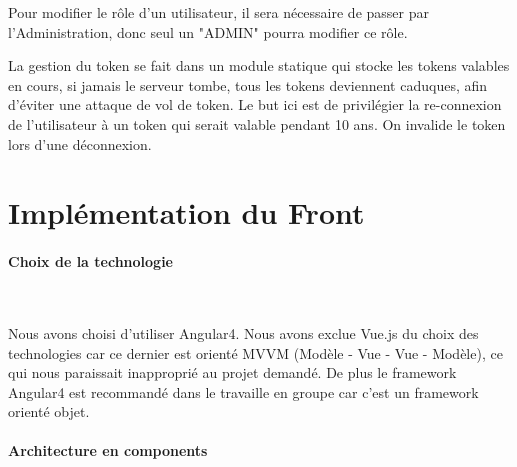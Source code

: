 \documentclass{article}
\begin{document}
  Pour modifier le rôle d'un utilisateur, il sera nécessaire de passer par l'Administration, donc seul un "ADMIN" pourra modifier ce rôle.

  La gestion du token se fait dans un module statique qui stocke les tokens valables en cours, si jamais le serveur tombe, tous les tokens deviennent caduques,
  afin d'éviter une attaque de vol de token. Le but ici est de privilégier la re-connexion de l'utilisateur à un token qui serait valable pendant 10 ans.
  On invalide le token lors d'une déconnexion.
  
\newpage
\section{Implémentation du Front}
  \paragraph{Choix de la technologie} \
  
  Nous avons choisi d'utiliser Angular4. Nous avons exclue Vue.js du choix des technologies
  car ce dernier est orienté MVVM (Modèle - Vue - Vue - Modèle), ce qui nous paraissait 
  inapproprié au projet demandé. De plus le framework Angular4 est recommandé dans le 
  travaille en groupe car c'est un framework orienté objet.
  
  \paragraph{Architecture en components} \
  
\end{document}
